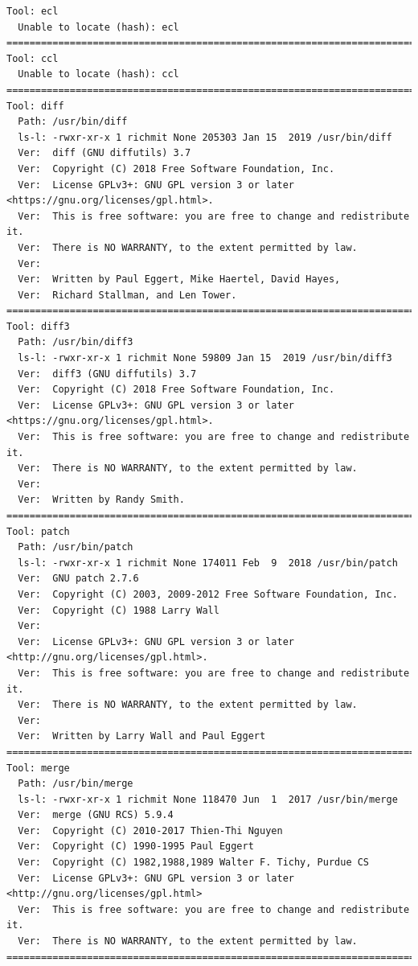 \documentclass[11pt]{article}
\begin{document}
\begin{verbatim}
Tool: ecl
  Unable to locate (hash): ecl
==========================================================================================
Tool: ccl
  Unable to locate (hash): ccl
==========================================================================================
Tool: diff
  Path: /usr/bin/diff
  ls-l: -rwxr-xr-x 1 richmit None 205303 Jan 15  2019 /usr/bin/diff
  Ver:  diff (GNU diffutils) 3.7
  Ver:  Copyright (C) 2018 Free Software Foundation, Inc.
  Ver:  License GPLv3+: GNU GPL version 3 or later <https://gnu.org/licenses/gpl.html>.
  Ver:  This is free software: you are free to change and redistribute it.
  Ver:  There is NO WARRANTY, to the extent permitted by law.
  Ver:  
  Ver:  Written by Paul Eggert, Mike Haertel, David Hayes,
  Ver:  Richard Stallman, and Len Tower.
==========================================================================================
Tool: diff3
  Path: /usr/bin/diff3
  ls-l: -rwxr-xr-x 1 richmit None 59809 Jan 15  2019 /usr/bin/diff3
  Ver:  diff3 (GNU diffutils) 3.7
  Ver:  Copyright (C) 2018 Free Software Foundation, Inc.
  Ver:  License GPLv3+: GNU GPL version 3 or later <https://gnu.org/licenses/gpl.html>.
  Ver:  This is free software: you are free to change and redistribute it.
  Ver:  There is NO WARRANTY, to the extent permitted by law.
  Ver:  
  Ver:  Written by Randy Smith.
==========================================================================================
Tool: patch
  Path: /usr/bin/patch
  ls-l: -rwxr-xr-x 1 richmit None 174011 Feb  9  2018 /usr/bin/patch
  Ver:  GNU patch 2.7.6
  Ver:  Copyright (C) 2003, 2009-2012 Free Software Foundation, Inc.
  Ver:  Copyright (C) 1988 Larry Wall
  Ver:  
  Ver:  License GPLv3+: GNU GPL version 3 or later <http://gnu.org/licenses/gpl.html>.
  Ver:  This is free software: you are free to change and redistribute it.
  Ver:  There is NO WARRANTY, to the extent permitted by law.
  Ver:  
  Ver:  Written by Larry Wall and Paul Eggert
==========================================================================================
Tool: merge
  Path: /usr/bin/merge
  ls-l: -rwxr-xr-x 1 richmit None 118470 Jun  1  2017 /usr/bin/merge
  Ver:  merge (GNU RCS) 5.9.4
  Ver:  Copyright (C) 2010-2017 Thien-Thi Nguyen
  Ver:  Copyright (C) 1990-1995 Paul Eggert
  Ver:  Copyright (C) 1982,1988,1989 Walter F. Tichy, Purdue CS
  Ver:  License GPLv3+: GNU GPL version 3 or later <http://gnu.org/licenses/gpl.html>
  Ver:  This is free software: you are free to change and redistribute it.
  Ver:  There is NO WARRANTY, to the extent permitted by law.
==========================================================================================

\end{verbatim}
\end{document}
